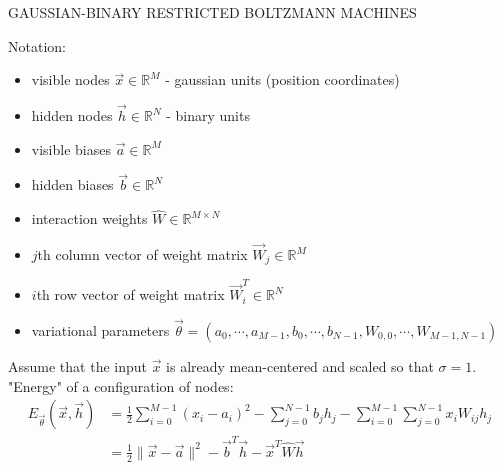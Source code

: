 \documentclass[12pt]{article}
\begin{document}
\begin{center}
\begin{large}
GAUSSIAN-BINARY RESTRICTED BOLTZMANN MACHINES
\end{large}
\end{center}

\noindent Notation:
\begin{itemize}
\item visible nodes $\vec{x}  \in \mathbb{R}^M$ - gaussian units (position coordinates)
\item hidden nodes $\vec{h} \in \mathbb{R}^N$ - binary units
\item visible biases $\vec{a} \in \mathbb{R}^M$
\item hidden biases $\vec{b} \in \mathbb{R}^N$
\item interaction weights $\hat{W} \in \mathbb{R}^{M\times N}$
\item $j$th column vector of weight matrix $\vec{W}_j \in \mathbb{R}^M$
\item $i$th row vector of weight matrix $\vec{W}_i^T \in \mathbb{R}^N$ 
\item variational parameters $\vec{\theta} = ( a_0, \cdots, a_{M-1},b_0,\cdots,b_{N-1}, W_{0,0},\cdots,W_{M-1,N-1} )$ \\
\end{itemize}

\noindent Assume that the input $\vec{x}$ is already mean-centered and scaled so that $\sigma = 1$. \\

\noindent "Energy" of a configuration of nodes:
\begin{align*}
E_{\vec{\theta}}(\vec{x},\vec{h}) &= \frac{1}{2} \sum_{i=0}^{M-1}(x_i - a_i)^2 - \sum_{j=0}^{N-1} b_j h_j - \sum_{i=0}^{M-1}\sum_{j=0}^{N-1} x_i W_{ij} h_j\\
&= \frac{1}{2} \| \vec{x} - \vec{a} \|^2 - \vec{b}^T \vec{h} - \vec{x}^T \hat{W} \vec{h}
\end{align*}
\end{document}
